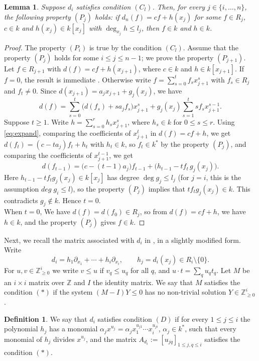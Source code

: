 \documentclass[11pt]{amsart}
\newtheorem{lemma}[theorem]{Lemma}
\theoremstyle{definition}
\newtheorem{definition}[theorem]{Definition}
\theoremstyle{remark}
\numberwithin{equation}{theorem}
\newcommand{\Z}{\mathbb{Z}}
\begin{document}
\begin{lemma}\label{lem:property}
Suppose $d_i$ satisfies condition $(C_l)$. Then, for every $j\in\{i,\dots,n\}$, the following property $(P_j)$
holds: if $d_n(f)=cf+h(x_j)$ for some $f\in R_j$, $c\in k$ and $h(x_j)\in k[x_j]$ with
$\deg_{x_j}h\le l_j$, then $f\in k$ and $h\in k$.
\end{lemma}

\begin{proof}
The property $(P_i)$ is true by the condition $(C_l)$. Assume that the property $(P_j)$ holds for some $i\le j\le n-1$; we prove the property $(P_{j+1})$.
Let $f\in R_{j+1}$ with $d(f)=cf+h(x_{j+1})$, where $c\in k$ and $h\in k[x_{j+1}]$.
If $f=0$, the result is immediate . Otherwise write $f=\sum_{s=0}^tf_sx_{j+1}^s$ with $f_s\in R_j$ and
$f_t\neq0$. Since $d(x_{j+1})=a_jx_{j+1}+g_j(x_j)$, we have
\begin{equation}\label{eq:expand}
d(f)=\sum_{s=0}^t\bigl(d(f_s)+sa_jf_s\bigr)x_{j+1}^s+g_j(x_j)\sum_{s=1}^tsf_sx_{j+1}^{s-1}.
\end{equation}
Suppose $t\ge1$. Write $h=\sum_{s=0}^r h_s x_{j+1}^s$, where $h_s\in k$ for $0\leq s\leq r$. Using \eqref{eq:expand}, comparing the coefficients of $x_{j+1}^t$ in $d(f)=cf+h$, we get
$d(f_t)=(c-ta_j)f_t+h_t$ with $h_t\in k$, so $f_t\in k^*$ by the property $(P_j)$, and comparing the coefficients of
$x_{j+1}^{t-1}$, we get
\[
d(f_{t-1})=\bigl(c-(t-1)a_j\bigr)f_{t-1}+\bigl(h_{t-1}-tf_t\,g_j(x_j)\bigr).
\]
Here $h_{t-1}-tf_tg_j(x_j)\in k[x_j]$ has degree $\deg g_j\le l_j$ (for $j=i$, this is the assumption $deg\;g_i\leq l$), so the property $(P_j)$ implies that
$tf_tg_j(x_j)\in k$. This contradicts $g_j\notin k$. Hence $t=0$.\\
When $t=0$, We have $d(f)=d(f_0)\in R_j$, so from $d(f)=cf+h$, we have $h\in k$, and the property $(P_j)$ gives $f\in k$.
\end{proof}
Next, we recall the matrix associated with $d_i$ in \cite{MMS25}, in a slightly modified form. Write
\[
d_i=h_1\partial_{x_1}+\cdots+h_i\partial_{x_i},\qquad h_j=d_i(x_j)\in R_i\setminus\{0\}.
\]
For $u,v\in\Z^i_{\ge0}$ we write $v\le u$ if $v_q\le u_q$ for all $q$, and $u\cdot t=\sum_qu_qt_q$.
Let $M$ be an $i\times i$ matrix over $\Z$ and $I$ the identity matrix. We say that $M$ satisfies the
condition $(\ast)$ if the system $(M-I)Y\le0$ has no non-trivial solution $Y\in\Z^i_{\ge0}$.

\begin{definition}\label{def:D}
We say that $d_i$ satisfies condition $(D)$ if for every $1\le j\le i$ the polynomial $h_j$ has a
monomial $\alpha_jx^{u_j}=\alpha_jx_1^{u_{j1}}\cdots x_i^{u_{ji}}$, $\alpha_j\in k^*$, such that every
monomial of $h_j$ divides $x^{u_j}$, and the matrix $A_{d_i}:=[u_{jq}]_{1\le j,q\le i}$ satisfies the condition
$(\ast)$.
\end{definition}
\end{document}
